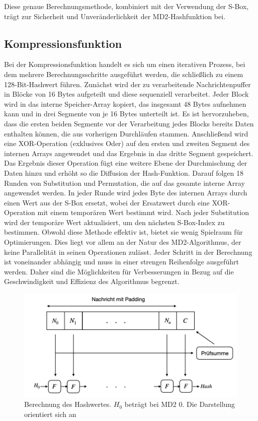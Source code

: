 Diese genaue Berechnungsmethode, kombiniert mit der Verwendung der S-Box,
trägt zur Sicherheit und Unveränderlichkeit der MD2-Hashfunktion bei.

\subsection{Kompressionsfunktion}


Bei der Kompressionsfunktion handelt es sich um einen iterativen Prozess, bei dem 
mehrere Berechnungsschritte ausgeführt werden, die schließlich zu einem 128-Bit-Hashwert 
führen. Zunächst wird der zu verarbeitende Nachrichtenpuffer in Blöcke von 16 
Bytes aufgeteilt und diese sequenziell verarbeitet. Jeder Block wird in das 
interne Speicher-Array kopiert, das insgesamt 48 Bytes aufnehmen kann und in drei 
Segmente von je 16 Bytes unterteilt ist. Es ist hervorzuheben, dass die ersten 
beiden Segmente vor der Verarbeitung jedes Blocks bereits Daten enthalten können, 
die aus vorherigen Durchläufen stammen. Anschließend wird eine XOR-Operation 
(exklusives Oder) auf den ersten und zweiten Segment des internen Arrays angewendet 
und das Ergebnis in das dritte Segment gespeichert. Das Ergebnis dieser Operation 
fügt eine weitere Ebene der Durchmischung der Daten hinzu und erhöht so die Diffusion 
der Hash-Funktion. Darauf folgen 18 Runden von Substitution und Permutation, die 
auf das gesamte interne Array angewendet werden. In jeder Runde wird jedes Byte 
des internen Arrays durch einen Wert aus der S-Box ersetzt, wobei der Ersatzwert 
durch eine XOR-Operation mit einem temporären Wert bestimmt wird. Nach jeder 
Substitution wird der temporäre Wert aktualisiert, um den nächsten S-Box-Index zu 
bestimmen. Obwohl diese Methode effektiv ist, bietet sie wenig Spielraum für 
Optimierungen. Dies liegt vor allem an der Natur des MD2-Algorithmus, der keine 
Parallelität in seinen Operationen zulässt. Jeder Schritt in der Berechnung ist 
voneinander abhängig und muss in einer strengen Reihenfolge ausgeführt werden. 
Daher sind die Möglichkeiten für Verbesserungen in Bezug auf die Geschwindigkeit 
und Effizienz des Algorithmus begrenzt.

\begin{figure}[h]
      \centering
      \includegraphics[scale=0.6]{pics/md2.001.jpeg}
      \caption{Berechnung des Hashwertes. $H_0$ beträgt bei MD2 0. 
      Die Darstellung orientiert sich an \cite{knudsen2005}}
\end{figure}


